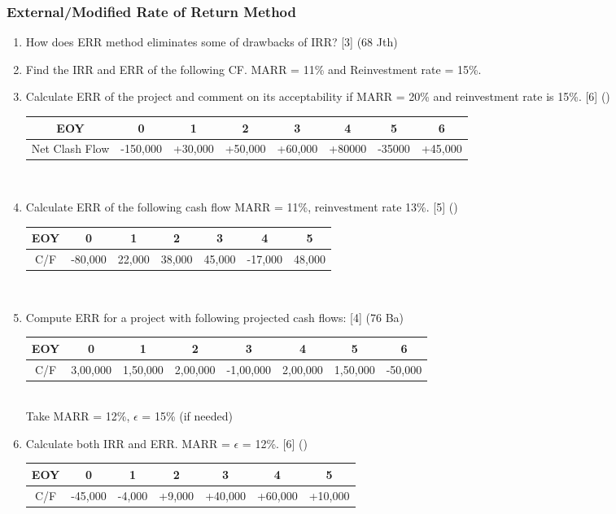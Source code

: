 \documentclass[12pt]{article}
\begin{document}
\subsubsection{External/Modified Rate of Return Method}
\begin{enumerate}[noitemsep, topsep = 0pt]
	\item How does ERR method eliminates some of drawbacks of IRR? \hfill [3] (68 Jth)
	
	\item Find the IRR and ERR of the following CF. MARR = 11\% and Reinvestment rate = 15\%.
	
	\item Calculate ERR of the project and comment on its acceptability if MARR = 20\% and reinvestment rate is 15\%. \hfill [6] ()
	\begin{tabular}{|c|c|c|c|c|c|c|c|}
		\hline
		EOY & 0 & 1 & 2 & 3 & 4 & 5 & 6\\ \hline
		Net Clash Flow & -150,000 & +30,000 & +50,000 & +60,000 & +80000 & -35000 & +45,000\\ 
		\hline
	\end{tabular}\\[1pt]
	
	\item Calculate ERR of the following cash flow MARR = 11\%, reinvestment rate 13\%. \hfill [5] ()
	\begin{tabular}{|c|c|c|c|c|c|c|}
		\hline
		EOY & 0 & 1 & 2 & 3 & 4 & 5 \\ \hline
		C/F & -80,000 & 22,000 & 38,000 & 45,000 & -17,000 & 48,000 \\ 
		\hline
	\end{tabular}\\[1pt]
	
	\item Compute ERR for a project with following projected cash flows: \hfill [4] (76 Ba)
	\begin{tabular}{|c|c|c|c|c|c|c|c|}
		\hline
		EOY & 0 & 1 & 2 & 3 & 4 & 5 & 6\\ \hline
		C/F & 3,00,000 & 1,50,000 & 2,00,000 & -1,00,000 & 2,00,000 & 1,50,000 & -50,000\\ 
		\hline
	\end{tabular}\\[0pt]
	Take MARR = 12\%, $\epsilon$ = 15\% (if needed)
	
	\item Calculate both IRR and ERR. MARR = $\epsilon$ = 12\%. \hfill [6] ()
	\begin{tabular}{|c|c|c|c|c|c|c|}
		\hline
		EOY & 0 & 1 & 2 & 3 & 4 & 5\\ \hline
		C/F & -45,000 & -4,000 & +9,000 & +40,000 & +60,000 & +10,000 \\ \hline
	\end{tabular}\\[0pt]
	

\end{enumerate}
\end{document}
